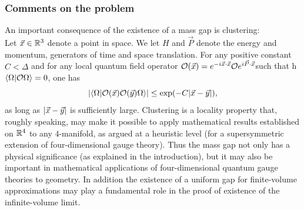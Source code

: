  \subsubsection{Comments on the problem}
 An important consequence of the existence of a mass gap is clustering: \\
 Let
 $\vec{x}\in \mathbb{R}^3$ denote a point in space. We let $H$ and $\vec{P}$ denote the energy and momentum,
 generators of time and space translation. For any positive constant $C < \Delta$ and for
 any local quantum field operator $\mathcal{O}(\vec{x}) = e^{- i \vec{x}\cdot\vec{x}} \mathcal{O} e^{i \vec{P}\cdot \vec{x}}$such that h$\braket{\Omega}{\mathcal{O} \Omega}= 0$, one
 has
 \begin{equation}
 \abs{\braket{\Omega}{\mathcal{O}(\vec{x})\mathcal{O}(\vec{y}) \Omega}} \leq \exp(-C \abs{\vec{x}-\vec{y}}),
 \end{equation}
 as long as $\abs{\vec{x}-\vec{y}}$ is sufficiently large. Clustering is a locality property that, roughly
 speaking, may make it possible to apply mathematical results established on $\mathbb{R}^4$ to
 any $4$-manifold, as argued at a heuristic level (for a supersymmetric extension of
 four-dimensional gauge theory). Thus the mass gap not only has a physical
 significance (as explained in the introduction), but it may also be important in
 mathematical applications of four-dimensional quantum gauge theories to geometry.
 In addition the existence of a uniform gap for finite-volume approximations may
 play a fundamental role in the proof of existence of the infinite-volume limit.\\
 
 
 
 
 
 
 
 
 
 
 
 
 
 
 
 
 
 
 
 
